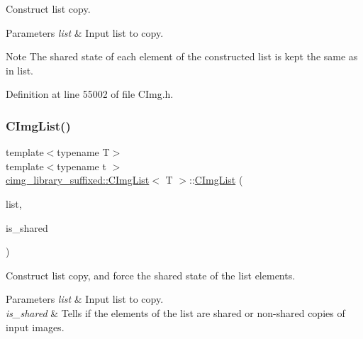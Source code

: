 Construct list copy. 


\begin{DoxyParams}{Parameters}
{\em list} & Input list to copy. \\
\hline
\end{DoxyParams}
\begin{DoxyNote}{Note}
The shared state of each element of the constructed list is kept the same as in {\ttfamily list}. 
\end{DoxyNote}


Definition at line 55002 of file C\+Img.\+h.

\mbox{\label{structcimg__library__suffixed_1_1CImgList_aab7354258426b0c99e502eda3765b056}} 
\subsubsection{\texorpdfstring{C\+Img\+List()}{CImgList()}\hspace{0.1cm}{\footnotesize\ttfamily [17/19]}}
{\footnotesize\ttfamily template$<$typename T$>$ \\
template$<$typename t $>$ \\
\hyperlink{structcimg__library__suffixed_1_1CImgList}{cimg\+\_\+library\+\_\+suffixed\+::\+C\+Img\+List}$<$ T $>$\+::\hyperlink{structcimg__library__suffixed_1_1CImgList}{C\+Img\+List} (\begin{DoxyParamCaption}\item[{const \hyperlink{structcimg__library__suffixed_1_1CImgList}{C\+Img\+List}$<$ t $>$ \&}]{list,  }\item[{const bool}]{is\+\_\+shared }\end{DoxyParamCaption})\hspace{0.3cm}{\ttfamily [inline]}}



Construct list copy, and force the shared state of the list elements. 


\begin{DoxyParams}{Parameters}
{\em list} & Input list to copy. \\
\hline
{\em is\+\_\+shared} & Tells if the elements of the list are shared or non-\/shared copies of input images. \\
\hline
\end{DoxyParams}


